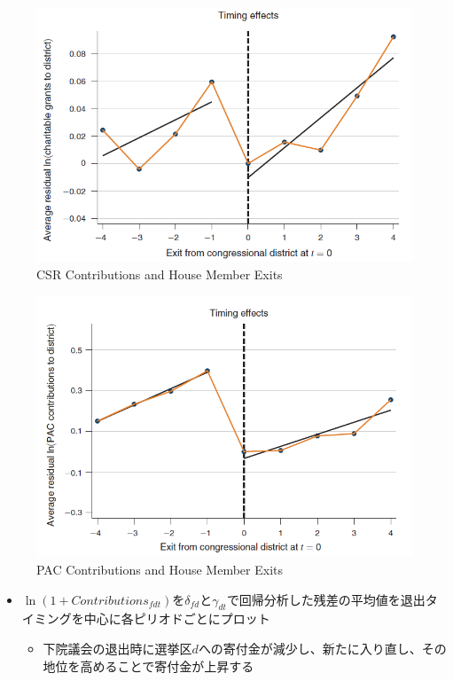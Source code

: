 \documentclass[../root]{subfiles}
\begin{document}
    \begin{figure}
    \centering
    \includegraphics[width = .8\linewidth]{0911kato/92611263-93457980-f2f3-11ea-941c-8eb0d34996b9.png}
    \caption{CSR Contributions and House Member Exits}
    \end{figure}

    \begin{figure}
    \centering
    \includegraphics[width = .8\linewidth]{0911kato/92611372-ae17ee00-f2f3-11ea-99c1-4a91a7a0ea07.png}
    \caption{PAC Contributions and House Member Exits}
    \end{figure}

    \begin{itemize}
    
    \item
      \(\ln(1 + Contributions_{fdt})\)を\(\delta_{fd}\)と\(\gamma_{dt}\)で回帰分析した残差の平均値を退出タイミングを中心に各ピリオドごとにプロット

      \begin{itemize}
      
      \item
        下院議会の退出時に選挙区\(d\)への寄付金が減少し、新たに入り直し、その地位を高めることで寄付金が上昇する
      \end{itemize}
    \end{itemize}
\end{document}
